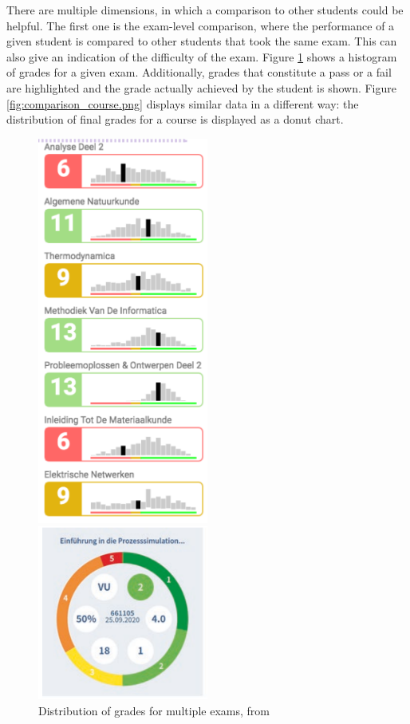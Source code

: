There are multiple dimensions, in which a comparison to other students could be helpful. The first one is the exam-level comparison, where the performance of a given student is compared to other students that took the same exam. This can also give an indication of the difficulty of the exam. Figure \ref{fig:comparison_exam.png} shows a histogram of grades for a given exam. Additionally, grades that constitute a pass or a fail are highlighted and the grade actually achieved by the student is shown. Figure \ref{fig:comparison_course.png} displays similar data in a different way: the distribution of final grades for a course is displayed as a donut chart.

\begin{figure}
    \begin{minipage}[b]{0.4\textwidth}
        \includegraphics[width=0.5\textwidth]{figures/comp_exam.png}
        \caption{Distribution of grades for multiple exams, from \cite{LISSA}}
        \label{fig:comparison_exam.png}
    \end{minipage}
    \hfill
    \begin{minipage}[b]{0.4\textwidth}
        \includegraphics[width=0.5\textwidth]{figures/comp_course.png}

\end{minipage}
\end{figure}
